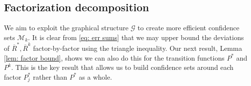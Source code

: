 \documentclass{article}
\newcommand{\Gc}{\mathcal{G}}
\newcommand{\Mc}{\mathcal{M}}
\begin{document}
\subsection{Factorization decomposition}

We aim to exploit the graphical structure $\Gc$ to create more efficient confidence sets $\Mc_k$.
It is clear from \eqref{eq: err sums} that we may upper bound the deviations of $\overline{R}^*,\overline{R}^k$ factor-by-factor using the triangle inequality.
Our next result, Lemma \ref{lem: factor bound}, shows we can also do this for the transition functions $P^*$ and $P^k$.
This is the key result that allows us to build confidence sets around each factor $P^*_j$ rather than $P^*$ as a whole.
\end{document}
